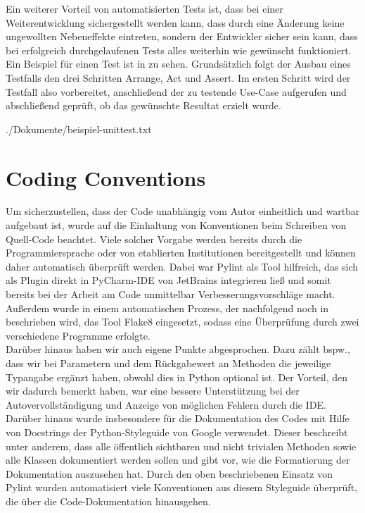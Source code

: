 Ein weiterer Vorteil von automatisierten Tests ist, dass bei einer Weiterentwicklung sichergestellt werden kann, dass
durch eine Änderung keine ungewollten Nebeneffekte eintreten, sondern der Entwickler sicher sein kann, dass bei
erfolgreich durchgelaufenen Tests alles weiterhin wie gewünscht funktioniert. \\

Ein Beispiel für einen Test ist in  zu sehen.
Grundsätzlich folgt der Ausbau eines Testfalls den drei Schritten Arrange, Act und Assert.
Im ersten Schritt wird der Testfall also vorbereitet, anschließend der zu testende Use-Case aufgerufen und abschließend
geprüft, ob das gewünschte Resultat erzielt wurde. 


{./Dokumente/beispiel-unittest.txt}

\section{Coding Conventions}
\label{sec:code-conventions}

Um sicherzustellen, dass der Code unabhängig vom Autor einheitlich und wartbar aufgebaut ist, wurde auf die Einhaltung
von Konventionen beim Schreiben von Quell-Code beachtet. 
Viele solcher Vorgabe werden bereits durch die Programmiersprache oder von etablierten Institutionen bereitgestellt und
können daher automatisch überprüft werden. 
Dabei war Pylint  als Tool hilfreich, das sich als Plugin direkt in PyCharm-IDE von JetBrains 
integrieren ließ und somit bereits bei der Arbeit am Code unmittelbar Verbesserungsvorschläge macht.
Außerdem wurde in einem automatischen Prozess, der nachfolgend noch in  beschrieben wird,
das Tool Flake8  eingesetzt, sodass eine Überprüfung durch zwei verschiedene Programme erfolgte. \\

Darüber hinaus haben wir auch eigene Punkte abgesprochen.
Dazu zählt bspw., dass wir bei Parametern und dem Rückgabewert an Methoden die jeweilige Typangabe ergänzt haben, obwohl
dies in Python optional ist.
Der Vorteil, den wir dadurch bemerkt haben, war eine bessere Unterstützung bei der Autovervollständigung und Anzeige
von möglichen Fehlern durch die IDE\@.
Darüber hinaus wurde insbesondere für die Dokumentation des Codes mit Hilfe von Docstrings der Python-Styleguide von
Google  verwendet.
Dieser beschreibt unter anderem, dass alle öffentlich sichtbaren und nicht trivialen Methoden sowie alle Klassen
dokumentiert werden sollen und gibt vor, wie die Formatierung der Dokumentation auszusehen hat.
Durch den oben beschriebenen Einsatz von Pylint wurden automatisiert viele Konventionen aus diesem Styleguide überprüft,
die über die Code-Dokumentation hinausgehen.
